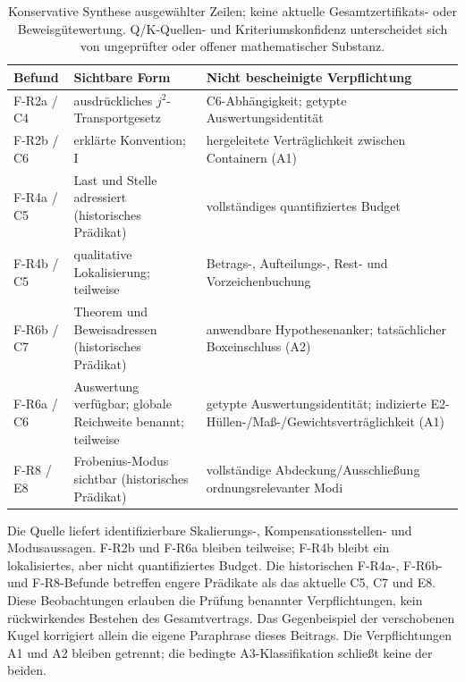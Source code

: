 \documentclass[11pt,a4paper]{article}
\begin{document}
\begin{table}[htbp]
\centering\footnotesize
\begin{tabularx}{\textwidth}{@{}l >{\raggedright\arraybackslash}X >{\raggedright\arraybackslash}X@{}}
\toprule
Befund & Sichtbare Form & Nicht bescheinigte Verpflichtung \\
\midrule
F-R2a / C4 & ausdrückliches $j^2$-Transportgesetz & C6-Abhängigkeit; getypte Auswertungsidentität \\
F-R2b / C6 & erklärte Konvention; I & hergeleitete Verträglichkeit zwischen Containern (A1) \\
F-R4a / C5 & Last und Stelle adressiert (historisches Prädikat) & vollständiges quantifiziertes Budget \\
F-R4b / C5 & qualitative Lokalisierung; teilweise & Betrags-, Aufteilungs-, Rest- und Vorzeichenbuchung \\
F-R6b / C7 & Theorem und Beweisadressen (historisches Prädikat) & anwendbare Hypothesenanker; tatsächlicher Boxeinschluss (A2) \\
F-R6a / C6 & Auswertung verfügbar; globale Reichweite benannt; teilweise & getypte Auswertungsidentität; indizierte E2-Hüllen-/Maß-/Gewichtsverträglichkeit (A1) \\
F-R8 / E8 & Frobenius-Modus sichtbar (historisches Prädikat) & vollständige Abdeckung/Ausschließung ordnungsrelevanter Modi \\
\bottomrule
\end{tabularx}
\caption{Konservative Synthese ausgewählter Zeilen; keine aktuelle
Gesamtzertifikats- oder Beweisgütewertung. Q/K-Quellen- und
Kriteriumskonfidenz unterscheidet sich von ungeprüfter oder
offener mathematischer Substanz.}
\label{tab:synthesis}
\end{table}

Die Quelle liefert identifizierbare Skalierungs-, Kompensationsstellen-
und Modusaussagen. F-R2b und F-R6a bleiben teilweise; F-R4b bleibt ein
lokalisiertes, aber nicht quantifiziertes Budget. Die historischen
F-R4a-, F-R6b- und F-R8-Befunde betreffen engere Prädikate als
das aktuelle C5, C7 und E8. Diese Beobachtungen erlauben die
Prüfung benannter Verpflichtungen, kein rückwirkendes Bestehen
des Gesamtvertrags. Das Gegenbeispiel der verschobenen Kugel
korrigiert allein die eigene Paraphrase dieses Beitrags. Die
Verpflichtungen A1 und A2 bleiben getrennt; die bedingte
A3-Klassifikation schließt keine der beiden.
\end{document}
